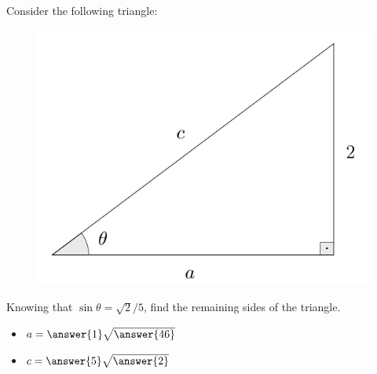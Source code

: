 \documentclass{ximera}
\author{Ivo Terek}
\begin{document}
\begin{exercise}

  Consider the following triangle:

  \begin{figure}[h]
    \centering
    \includegraphics[scale=.3]{RTT3-fig.png}
  \end{figure}
  
  Knowing that $\sin\theta = \sqrt{2}/5$, find the remaining sides of the triangle.

  \begin{itemize}
  \item $a = \answer{1}\sqrt{ \answer{46} }$ 
  \item $c = \answer{5}\sqrt{ \answer{2} }$
  \end{itemize}

  
\end{exercise}
\end{document}

